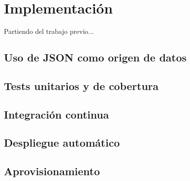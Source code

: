 \chapter{Implementación}

Partiendo del trabajo previo...

\section{Uso de JSON como origen de datos}

\section{Tests unitarios y de cobertura}

\section{Integración continua}

\section{Despliegue automático}

\section{Aprovisionamiento}